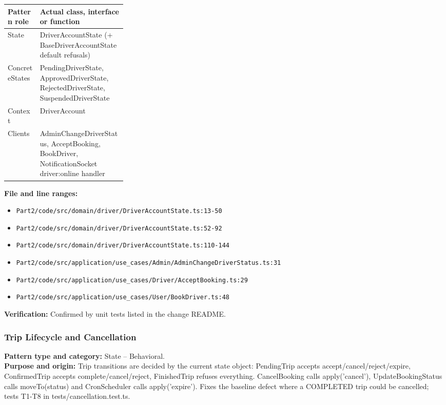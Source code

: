\documentclass[11pt,a4paper]{article}
\begin{document}
\noindent\begin{tabularx}{\linewidth}{@{}P{0.27\linewidth}Y@{}}
\toprule Pattern role & Actual class, interface or function \\ \midrule
State & DriverAccountState (+ BaseDriverAccountState default refusals) \\
ConcreteStates & PendingDriverState, ApprovedDriverState, RejectedDriverState, SuspendedDriverState \\
Context & DriverAccount \\
Clients & AdminChangeDriverStatus, AcceptBooking, BookDriver, NotificationSocket driver:online handler \\
\bottomrule
\end{tabularx}

\noindent\textbf{File and line ranges:}\begin{itemize}\setlength\itemsep{0pt}\item \texttt{Part2/\allowbreak{}code/\allowbreak{}src/\allowbreak{}domain/\allowbreak{}driver/\allowbreak{}DriverAccountState.\allowbreak{}ts:13-50}\item \texttt{Part2/\allowbreak{}code/\allowbreak{}src/\allowbreak{}domain/\allowbreak{}driver/\allowbreak{}DriverAccountState.\allowbreak{}ts:52-92}\item \texttt{Part2/\allowbreak{}code/\allowbreak{}src/\allowbreak{}domain/\allowbreak{}driver/\allowbreak{}DriverAccountState.\allowbreak{}ts:110-144}\item \texttt{Part2/\allowbreak{}code/\allowbreak{}src/\allowbreak{}application/\allowbreak{}use\_\allowbreak{}cases/\allowbreak{}Admin/\allowbreak{}AdminChangeDriverStatus.\allowbreak{}ts:31}\item \texttt{Part2/\allowbreak{}code/\allowbreak{}src/\allowbreak{}application/\allowbreak{}use\_\allowbreak{}cases/\allowbreak{}Driver/\allowbreak{}AcceptBooking.\allowbreak{}ts:29}\item \texttt{Part2/\allowbreak{}code/\allowbreak{}src/\allowbreak{}application/\allowbreak{}use\_\allowbreak{}cases/\allowbreak{}User/\allowbreak{}BookDriver.\allowbreak{}ts:48}\end{itemize}
\noindent\textbf{Verification:} Confirmed by unit tests listed in the change README.

\subsubsection*{Trip Lifecycle and Cancellation}
\textbf{Pattern type and category:} State -- Behavioral.\\
\textbf{Purpose and origin:} Trip transitions are decided by the current state object: PendingTrip accepts accept/cancel/reject/expire, ConfirmedTrip accepts complete/cancel/reject, FinishedTrip refuses everything. CancelBooking calls apply('cancel'), UpdateBookingStatus calls moveTo(status) and CronScheduler calls apply('expire'). Fixes the baseline defect where a COMPLETED trip could be cancelled; tests T1-T8 in tests/cancellation.test.ts.
\end{document}
